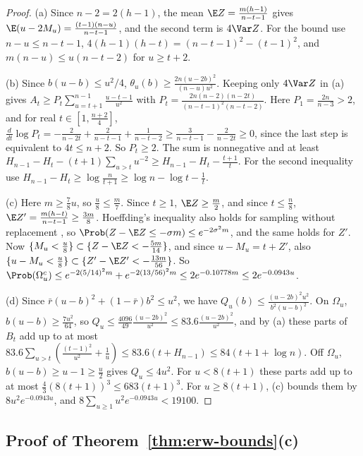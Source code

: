 \begin{proof}
(a) Since $n-2=2(h-1)$, the mean $\E Z=\frac{m(h-1)}{n-t-1}$ gives
$\E(u-2M_u)=\frac{(t-1)(n-u)}{n-t-1}$, and the second term is
$4\Var Z$. For the bound use $n-u\le n-t-1$,
$4(h-1)(h-t)=(n-t-1)^2-(t-1)^2$, and $m(n-u)\le u(n-t-2)$ for $u\ge t+2$.

(b) Since $b(u-b)\le u^2/4$, $\theta_u(b)\ge\frac{2n(u-2b)^2}{(n-u)u^2}$.
Keeping only $4\Var Z$ in (a) gives
$A_t\ge P_t\sum_{u=t+1}^{n-1}\frac{u-t-1}{u^2}$ with
$P_t=\frac{2n(n-2)(n-2t)}{(n-t-1)^2(n-t-2)}$. Here $P_1=\frac{2n}{n-3}>2$,
and for real $t\in[1,\frac{n+2}4]$,
$\frac{d}{dt}\log P_t=-\frac2{n-2t}+\frac2{n-t-1}+\frac1{n-t-2}
\ge\frac3{n-t-1}-\frac2{n-2t}\ge0$, since the last step is equivalent to
$4t\le n+2$. So $P_t\ge2$. The sum is nonnegative and at least
$H_{n-1}-H_t-(t+1)\sum_{u>t}u^{-2}\ge H_{n-1}-H_t-\frac{t+1}t$. For the
second inequality use $H_{n-1}-H_t\ge\log\frac n{t+1}\ge\log n-\log t-\frac1t$.

(c) Here $m\ge\frac78u$, so $\frac u8\le\frac m7$. Since $t\ge1$,
$\E Z\ge\frac m2$, and since $t\le\frac n8$,
$\E Z'=\frac{m(h-t)}{n-t-1}\ge\frac{3m}8$. Hoeffding's inequality also holds
for sampling without replacement \cite[Section~6]{hoeffding1963}, so
$\Prob(Z-\E Z\le-\sigma m)\le e^{-2\sigma^2m}$, and the same holds for $Z'$.
Now $\{M_u<\frac u8\}\subset\{Z-\E Z<-\frac{5m}{14}\}$, and since
$u-M_u=t+Z'$, also $\{u-M_u<\frac u8\}\subset\{Z'-\E Z'<-\frac{13m}{56}\}$.
So $\Prob(\Omega_u^c)\le e^{-2(5/14)^2m}+e^{-2(13/56)^2m}\le2e^{-0.10778m}
\le2e^{-0.0943u}$.

(d) Since $\bar r(u-b)^2+(1-\bar r)b^2\le u^2$, we have
$Q_u(b)\le\frac{(u-2b)^2u^2}{b^2(u-b)^2}$. On $\Omega_u$,
$b(u-b)\ge\frac{7u^2}{64}$, so $Q_u\le\frac{4096}{49}\frac{(u-2b)^2}{u^2}
\le83.6\frac{(u-2b)^2}{u^2}$,
and by (a) these parts of $B_t$ add up to at most
$83.6\sum_{u>t}(\frac{(t-1)^2}{u^2}+\frac1u)\le83.6(t+H_{n-1})
\le84(t+1+\log n)$. Off $\Omega_u$, $b(u-b)\ge u-1\ge\frac u2$ gives
$Q_u\le4u^2$. For $u<8(t+1)$ these parts add up to at most
$\frac43(8(t+1))^3\le683(t+1)^3$. For $u\ge8(t+1)$, (c) bounds them by
$8u^2e^{-0.0943u}$, and $8\sum_{u\ge1}u^2e^{-0.0943u}<19100$.
\end{proof}

\subsection{Proof of \texorpdfstring{Theorem~\ref{thm:erw-bounds}(c)}{Theorem 2.6(c)}}\label{app:erw-proof-c}

